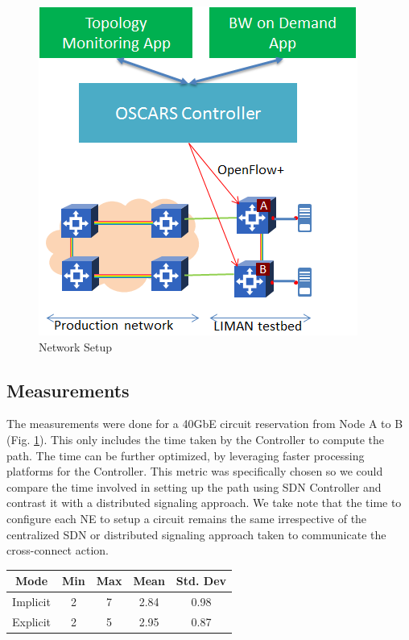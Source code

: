 \documentclass{sig-alternate-2013}
\begin{document}
	\begin{figure}[htb]
	\centering
	\includegraphics[scale=0.50]{LIMAN.png}
	\caption{Network Setup}
	\label{fig:LIMAN}
	\end{figure}

 \subsection{Measurements}
 \label{sec:measure}
 The measurements were done for a 40GbE circuit reservation from Node A to B (Fig. \ref{fig:LIMAN}). This only includes the time 
 taken by the Controller to compute the path.
 The time can be further optimized, by leveraging faster processing platforms for the Controller. This metric was specifically chosen so we could compare the
 time involved in setting up the path using SDN Controller and contrast it with a distributed signaling approach. We take note that the time to configure each NE to setup a circuit remains the same 
 irrespective of the centralized SDN or distributed signaling approach taken to communicate the cross-connect action.

 \begin{center}
  \begin{tabular} { | c |  c | c | c | c | }
   \hline
    Mode & Min & Max & Mean & Std. Dev \\ \hline
    Implicit & 2   &   7    & 2.84  & 0.98 \\
    Explicit & 2   &   5    & 2.95  & 0.87 \\
   \hline
  \end{tabular}
  \label{tab:measurements}
 \end{center}
\end{document}
